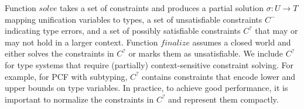 \documentclass{llncs}
\begin{document}
\noindent Function $\mathit{solve}$ takes a set of constraints and produces a
partial solution $\sigma : U \to T$ mapping unification variables to types, a
set of unsatisfiable constraints $C^-$ indicating type errors, and a set of
possibly satisfiable constraints $C^?$ that may or may not hold in a larger
context. Function $\mathit{finalize}$ assumes a closed world and either solves
the constraints in $C^?$ or marks them as unsatisfiable. We include $C^?$ for
type systems that require (partially) context-sensitive constraint solving. For
example, for PCF with subtyping, $C^?$ contains constraints that encode lower
and upper bounds on type variables. In practice, to achieve good performance, it
is important to normalize the constraints in $C^?$ and represent them compactly.


\end{document}
